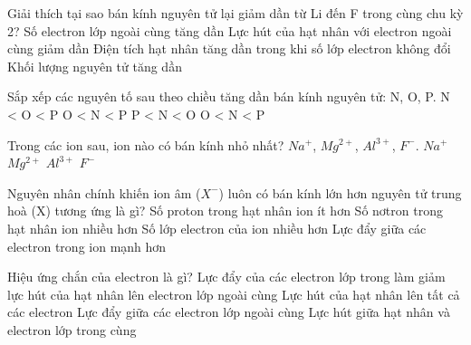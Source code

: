 \begin{ex}
    Giải thích tại sao bán kính nguyên tử lại giảm dần từ Li đến F trong cùng chu kỳ 2?
    \choice
    {Số electron lớp ngoài cùng tăng dần}
    {Lực hút của hạt nhân với electron ngoài cùng giảm dần}
    {\True Điện tích hạt nhân tăng dần trong khi số lớp electron không đổi}
    {Khối lượng nguyên tử tăng dần}
\end{ex}

\begin{ex}
    Sắp xếp các nguyên tố sau theo chiều tăng dần bán kính nguyên tử: N, O, P. 
    \choice
    {N < O < P}
    {O < N < P}
    {P < N < O}
    {\True O < N < P}
\end{ex}
\begin{ex}
    Trong các ion sau, ion nào có bán kính nhỏ nhất? $Na^+$, $Mg^{2+}$,  $Al^{3+}$, $F^-$.
    \choice
    {$Na^+$}
    {$Mg^{2+}$}
    {\True $Al^{3+}$}
    {$F^-$}
\end{ex}

\begin{ex}
    Nguyên nhân chính khiến ion âm ($X^−$) luôn có bán kính lớn hơn nguyên tử trung hoà (X) tương ứng là gì?
    \choice
    {Số proton trong hạt nhân ion ít hơn}
    {Số nơtron trong hạt nhân ion nhiều hơn}
    {Số lớp electron của ion nhiều hơn}
    {\True Lực đẩy giữa các electron trong ion mạnh hơn}
\end{ex}

\begin{ex}
    Hiệu ứng chắn của electron là gì?
    \choice
    {\True Lực đẩy của các electron lớp trong làm giảm lực hút của hạt nhân lên electron lớp ngoài cùng}
    {Lực hút của hạt nhân lên tất cả các electron}
    {Lực đẩy giữa các electron lớp ngoài cùng}
    {Lực hút giữa hạt nhân và electron lớp trong cùng}
\end{ex}

